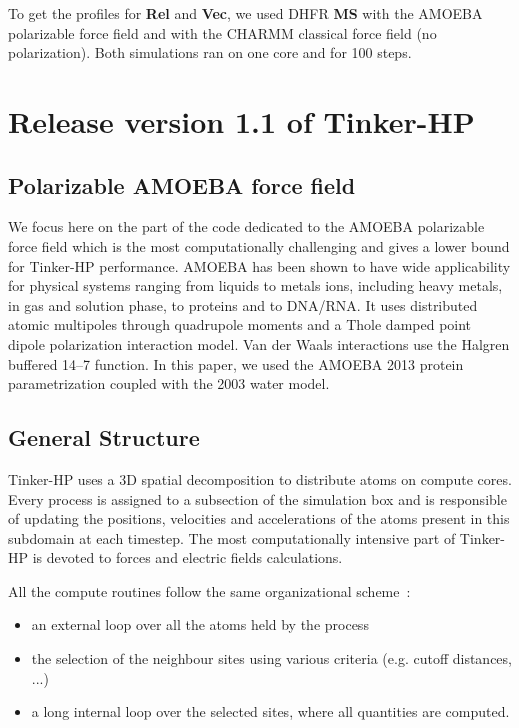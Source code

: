\documentclass[9pt,comparison]{livecoms}
\begin{document}
To get the profiles for \textbf{Rel} and \textbf{Vec}, we used DHFR \textbf{MS} with the AMOEBA polarizable force field and with the CHARMM classical force field (no polarization). Both simulations ran on one core and for 100 steps.
\section{Release version 1.1 of Tinker-HP}
\subsection{Polarizable AMOEBA force field}
\hspace{\parindent}We focus here on the part of the code dedicated to the AMOEBA polarizable force field which is the most computationally challenging and gives a lower bound for Tinker-HP performance\cite{ren2003polarizable,Ponder2007CurrentField}.
AMOEBA has been shown to have wide applicability for physical systems ranging from liquids to metals ions,\cite{Amber9AMOEBA,wu2010polarizable} including heavy metals,\cite{Marjolin2012,Marjolin2014} in gas and solution phase, to proteins \cite{shi2013polarizable,zhang2018amoeba} and to DNA/RNA\cite{zhang2018amoeba}. It uses distributed atomic multipoles through quadrupole moments and a Thole damped point dipole polarization interaction model. Van der Waals interactions use the Halgren buffered 14–7 function. In this paper, we used the AMOEBA 2013 protein parametrization \cite{shi2013polarizable,zhang2018amoeba} coupled with the 2003 water model\cite{ren2003polarizable}.
\subsection{General Structure}
\hspace{\parindent}Tinker-HP uses a 3D spatial decomposition to distribute atoms on compute cores. Every process is assigned to a subsection of the simulation box and is responsible of updating the positions, velocities and accelerations of the atoms present in this subdomain at each timestep\cite{Tinker-HP}. The most computationally intensive part of Tinker-HP is devoted to forces and electric fields calculations. 

All the compute routines follow the same organizational scheme~:
\begin{itemize}
    \item an external loop over all the atoms held by the process
    \item the selection of the neighbour sites using various criteria (e.g. cutoff distances, ...)
    \item a long internal loop over the selected sites, where all quantities are computed.
\end{itemize}
\end{document}
